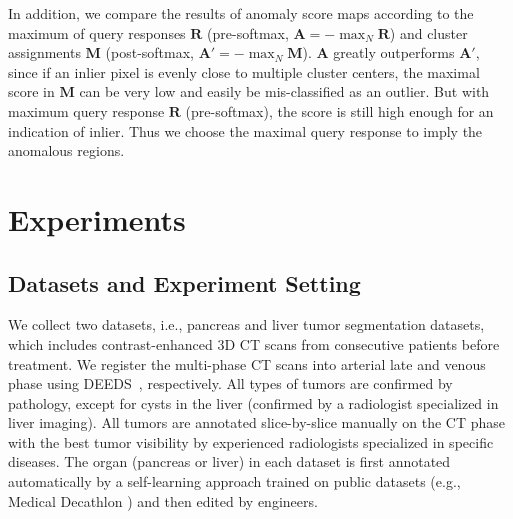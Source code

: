 \documentclass[10pt,twocolumn,letterpaper]{article}
\begin{document}
In addition, we compare the results of anomaly score maps according to the maximum of query responses $\mathbf{R}$ (pre-softmax, $\mathbf{A}=-\max_{N} \mathbf{R}$) and cluster assignments $\mathbf{M}$ (post-softmax, $\mathbf{A}'=-\max_{N} \mathbf{M}$). $\mathbf{A}$ greatly outperforms $\mathbf{A}'$, since if an inlier pixel is evenly close to multiple cluster centers, the maximal score in $\mathbf{M}$ can be very low and easily be mis-classified as an outlier. But with maximum query response $\mathbf{R}$ (pre-softmax), the score is still high enough for an indication of inlier. Thus we choose the maximal query response to imply the anomalous regions.

\vspace{-0.2cm}

\section{Experiments}
\label{sec:experiments}
\subsection{Datasets and Experiment Setting}
We collect two datasets, i.e., pancreas and liver tumor segmentation datasets, which includes contrast-enhanced 3D CT scans from consecutive patients before treatment.  We register the multi-phase CT scans into arterial late and venous phase using DEEDS~\cite{heinrich2013mrf}, respectively. All types of tumors are confirmed by pathology, except for cysts in the liver (confirmed by a radiologist specialized in liver imaging). All tumors are annotated slice-by-slice manually on the CT phase with the best tumor visibility by experienced radiologists specialized in specific diseases. The organ (pancreas or liver) in each dataset is first annotated automatically by a self-learning approach \cite{zhang2018self} trained on public datasets (e.g., Medical Decathlon \cite{antonelli2022medical}) and then edited by engineers.
\end{document}
